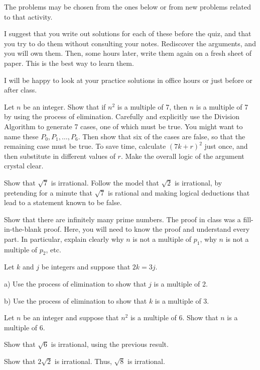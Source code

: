 
The problems may be chosen from the ones below or from new problems related to that activity.

I suggest that you write out solutions for each of these before the quiz, and that you try to do them without consulting your notes.
Rediscover the arguments, and you will own them.
Then, some hours later, write them again on a fresh sheet of paper.
This is the best way to learn them.

I will be happy to look at your practice solutions in office hours or just before or after class.

\blist{0.5in}
\item Let $n$ be an integer.  Show that if $n^2$ is a multiple of 7, then $n$ is a multiple of 7 by using the process of elimination.
Carefully and explicitly use the Division Algorithm to generate 7 cases, one of which must be true.
You might want to name these $P_0, P_1, \ldots, P_6$.
Then show that six of the cases are false, so that the remaining case must be true.
To save time, calculate $(7k+r)^2$ just once, and then substitute in different values of $r$.
Make the overall logic of the argument crystal clear.

\item Show that $\sqrt{7}$ is irrational.
Follow the model that $\sqrt{2}$ is irrational, by pretending for a minute that $\sqrt{7}$ is rational and making logical deductions that lead to a statement known to be false.

\item Show that there are infinitely many prime numbers.
The proof in class was a fill-in-the-blank proof.  Here, you will need to know the proof and understand every part.
In particular, explain clearly why $n$ is not a multiple of $p_1$, why $n$ is not a multiple of $p_2$, etc.

\item Let $k$ and $j$ be integers and suppose that $2k = 3j$.

a) Use the process of elimination to show that $j$ is a multiple of 2.

b) Use the process of elimination to show that $k$ is a multiple of 3.

\item Let $n$ be an integer and suppose that $n^2$ is a multiple of 6.
Show that $n$ is a multiple of 6.

\item Show that $\sqrt{6}$ is irrational, using the previous result.

\item Show that $2\sqrt{2}$ is irrational.  Thus, $\sqrt{8}$ is irrational.

\elist
\vfill          %
